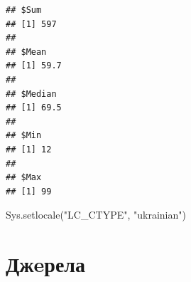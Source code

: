 \documentclass[
]{book}
\newenvironment{Shaded}{\begin{snugshade}}{\end{snugshade}}
\newcommand{\ControlFlowTok}[1]{\textcolor[rgb]{0.13,0.29,0.53}{\textbf{#1}}}
\newcommand{\FunctionTok}[1]{\textcolor[rgb]{0.00,0.00,0.00}{#1}}
\newcommand{\NormalTok}[1]{#1}
\newcommand{\OtherTok}[1]{\textcolor[rgb]{0.56,0.35,0.01}{#1}}
\newcommand{\SpecialCharTok}[1]{\textcolor[rgb]{0.00,0.00,0.00}{#1}}
\newcommand{\StringTok}[1]{\textcolor[rgb]{0.31,0.60,0.02}{#1}}
\begin{document}
\begin{Shaded}
\end{Shaded}

\begin{verbatim}
## $Sum
## [1] 597
## 
## $Mean
## [1] 59.7
## 
## $Median
## [1] 69.5
## 
## $Min
## [1] 12
## 
## $Max
## [1] 99
\end{verbatim}

\begin{Shaded}
\begin{Highlighting}[]
\FunctionTok{Sys.setlocale}\NormalTok{(}\StringTok{"LC\_CTYPE"}\NormalTok{, }\StringTok{"ukrainian"}\NormalTok{)}
\end{Highlighting}
\end{Shaded}

\hypertarget{ux434ux436eux440ux435ux43bux430}{%
\chapter*{Джeрела}\label{ux434ux436eux440ux435ux43bux430}}

  
\end{document}
